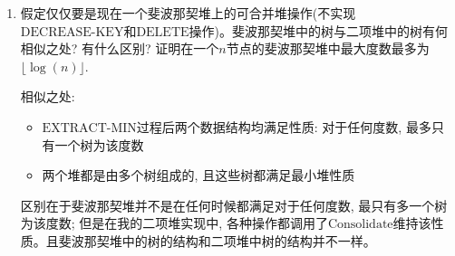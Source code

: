 \documentclass[paper=a4, fontsize=11pt]{scrartcl} %
\numberwithin{equation}{section} %
\numberwithin{figure}{section} %
\numberwithin{table}{section} %
\begin{document}
\begin{enumerate}[a]
\begin{addmargin}[3em]{0em}
    \begin{algorithm}[H]
      \caption{HEAP-EXTRACT-MIN($H_1$, $H_2$)}
      \begin{algorithmic}
        \State $z=H.\mbox{min}$
        \State $x.p = \mbox{NIL}$
        \EndFor
        \EndIf
        \State $\mbox{CONSOLIDATE}(H)$
        \State\Return $z$
      \end{algorithmic}
    \end{algorithm}

    \begin{algorithm}[H]
      \caption{HEAP-DECREASE-KEY($H$, $x$, $k$)}
      \begin{algorithmic}
        \EndIf
        \State $x.\mbox{key} = k$
        \EndWhile
        \State $\mbox{Consolidate}(H)$
      \end{algorithmic}
    \end{algorithm}

    \begin{algorithm}[H]
      \caption{DELETE($H$, $x$)}
      \begin{algorithmic}
        \State $\mbox{HEAP-DECREASE-KEY}(H, x, -\inf)$
        \State $\mbox{HEAP-EXTRACT-MIN}(H)$
      \end{algorithmic}
    \end{algorithm}
    \end{addmargin}

  \item 假定仅仅要是现在一个斐波那契堆上的可合并堆操作(不实现$\mbox{DECREASE-KEY}$和$\mbox{DELETE}$操作)。斐波那契堆中的树与二项堆中的树有何相似之处? 有什么区别? 证明在一个$n$节点的斐波那契堆中最大度数最多为$\lfloor \log(n) \rfloor$.
  \begin{addmargin}[3em]{0em}
    相似之处:
    \begin{itemize}
    \item $\mbox{EXTRACT-MIN}$过程后两个数据结构均满足性质: 对于任何度数, 最多只有一个树为该度数
    \item 两个堆都是由多个树组成的, 且这些树都满足最小堆性质
    \end{itemize}
    区别在于斐波那契堆并不是在任何时候都满足对于任何度数, 最只有多一个树为该度数; 但是在我的二项堆实现中, 各种操作都调用了$\mbox{Consolidate}$维持该性质。且斐波那契堆中的树的结构和二项堆中树的结构并不一样。


\end{addmargin}
\end{enumerate}
\end{document}
